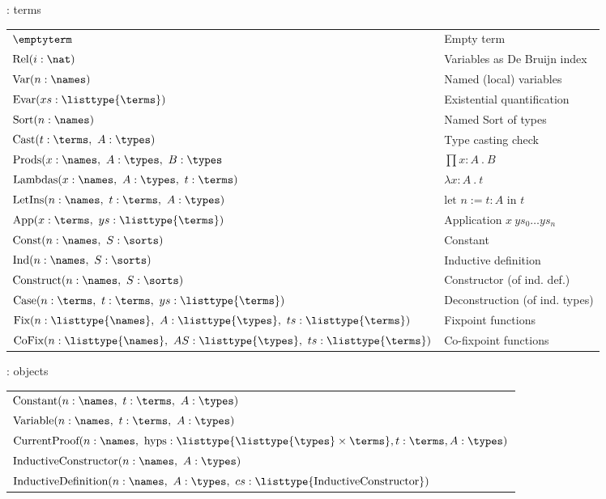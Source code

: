 \begin{frame}{\pcic: terms}
	\vspace{-0.7em}
	\begin{tabular}{ll}
		$\emptyterm$                                        & Empty term \\
		$\text{Rel}(i:\nat)$                       & Variables as De Bruijn index \\
		$\text{Var}(n:\names)$                     & Named (local) variables \\
		$\text{Evar}(xs:\listtype{\terms}) $        & Existential quantification \\
		$\text{Sort}(n:\names)$                    & Named Sort of types \\
		$\text{Cast}(t:\terms,~ A:\types)$ & Type casting check \\
		$\text{Prods}(x:\names,~ A:\types,~ B:\types$ & $\prod x:A ~.~ B$ \\
		$\text{Lambdas}(x:\names,~ A:\types,~ t:\terms)$   & $\lambda x:A ~.~ t$ \\
		$\text{LetIns}(n:\names,~ t:\terms,~ A:\types)$    & $\text{let~} n := t : A \text{~in~} t$ \\
		$\text{App}(x:\terms,~ ys:\listtype{\terms})$ & Application $x~ys_0 \ldots ys_n$ \\
		$\text{Const}(n:\names,~ S:\sorts)$ & Constant \\
		$\text{Ind}(n:\names,~ S:\sorts)$  & Inductive definition \\
		$\text{Construct}(n:\names,~ S:\sorts)$ & Constructor (of ind. def.) \\
		$\text{Case}(n:\terms,~ t:\terms,~ ys:\listtype{\terms})$ & Deconstruction (of ind. types) \\
		$\text{Fix}(n:\listtype{\names},~ A:\listtype{\types},~ ts:\listtype{\terms})$ & Fixpoint functions \\
		$\text{CoFix}(n:\listtype{\names},~ AS:\listtype{\types},~ ts:\listtype{\terms})$ & Co-fixpoint functions \\
	\end{tabular}
\end{frame}

\begin{frame}{\pcic: objects}
	\begin{tabular}{l}
		$\text{Constant}(n:\names,~ t:\terms,~ A:\types)$ \\
		$\text{Variable}(n:\names,~ t:\terms,~ A:\types)$ \\
		$\text{CurrentProof}(n:\names,~ \text{hyps}:\listtype{\listtype{\types} \times \terms}, t:\terms, A:\types)$ \\
		$\text{InductiveConstructor}(n:\names,~ A:\types)$ \\
		$\text{InductiveDefinition}(n:\names,~ A:\types,~ cs:\listtype{\text{InductiveConstructor}})$
	\end{tabular}
\end{frame}

